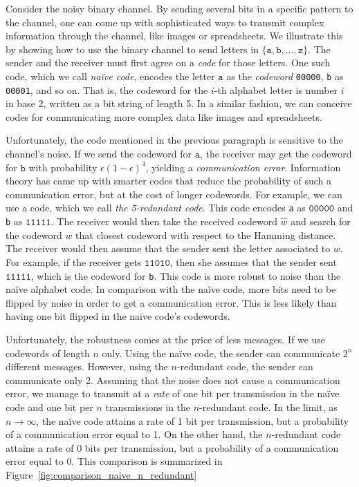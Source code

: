 Consider the noisy binary channel. By sending several bits in a specific pattern to the channel, one can come up with sophisticated ways to transmit complex information through the channel, like images or spreadsheets. We illustrate this by showing how to use the binary channel to send letters in $\{\texttt{a}, \texttt{b}, \ldots, \texttt{z}\}$. The sender and the receiver must first agree on a \emph{code} for those letters. One such code, which we call \emph{na\"ive code}, encodes the letter $\texttt{a}$ as the \emph{codeword} \texttt{00000}, \texttt{b} as \texttt{00001}, and so on. That is, the codeword for the $i$-th alphabet letter is number $i$ in base 2, written as a bit string of length 5. In a similar fashion, we can conceive codes for communicating more complex data like images and spreadsheets.

Unfortunately, the code mentioned in the previous paragraph is sensitive to the channel's noise. If we send the codeword for $\texttt{a}$, the receiver may get the codeword for $\texttt{b}$ with probability $\epsilon\left(1 - \epsilon\right)^4$, yielding a \emph{communication error}. Information theory has came up with smarter codes that reduce the probability of such a communication error, but at the cost of longer codewords. For example, we can use a code, which we call \emph{the 5-redundant code}. This code encodes \texttt{a} as $\texttt{00000}$ and \texttt{b} as $\texttt{11111}$. The receiver would then take the received codeword $\hat{w}$ and search for the codeword $w$ that closest codeword with respect to the Hamming distance. The receiver would then assume that the sender sent the letter associated to $w$. For example, if the receiver gets $\texttt{11010}$, then she assumes that the sender sent $\texttt{11111}$, which is the codeword for \texttt{b}. This code is more robust to noise than the na\"ive alphabet code. In comparison with the na\"ive code, more bits need to be flipped by noise in order to get a communication error. This is less likely than having one bit flipped in the na\"ive code's codewords.

Unfortunately, the robustness comes at the price of less messages. If we use codewords of length $n$ only. Using the na\"ive code, the sender can communicate $2^n$ different messages. However, using the $n$-redundant code, the sender can communicate only 2. Assuming that the noise does not cause a communication error, we manage to transmit at a \emph{rate} of one bit per transmission in the na\"ive code and one bit per $n$ transmissions in the $n$-redundant code. In the limit, as $n \to \infty$, the na\"ive code attains a rate of 1 bit per transmission, but a probability of a communication error equal to 1. On the other hand, the $n$-redundant code attains a rate of 0 bits per transmission, but a probability of a communication error equal to 0. This comparison is summarized in Figure~\ref{fig:comparison_naive_n_redundant}

